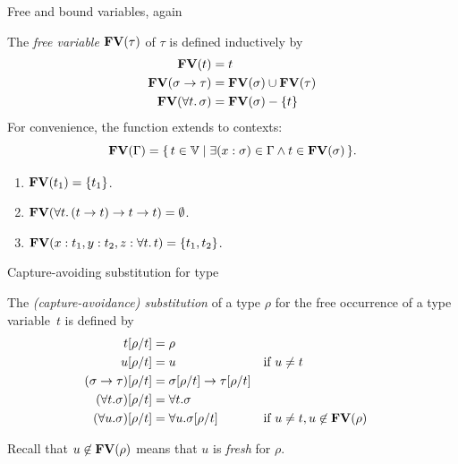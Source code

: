 \begin{frame}{Free and bound variables, again}
\begin{definition}
  The \emph{free variable} $\mathbf{FV}(\tau)$ of $\tau$ is defined inductively by
  \begin{align*}
    \mathbf{FV}(t) & {} = t \\
    \mathbf{FV}(\sigma \to \tau) & {} = \mathbf{FV}(\sigma) \cup \mathbf{FV}(\tau) \\
    \mathbf{FV}(\forall t.\, \sigma) & {} = \mathbf{FV}(\sigma) - \{t\}
  \end{align*}
  For convenience, the function extends to contexts:
  \[
    \mathbf{FV}(\Gamma) = \{\, t \in \mathbb{V}\mid \exists (x : \sigma) \in \Gamma
      \wedge t \in \mathbf{FV}(\sigma) \,\}.
  \]
\end{definition}
  \begin{enumerate}
    \item $\mathbf{FV}(t_1) = \{t_1\}$.
    \item $\mathbf{FV}(\forall t.\, (t \to t) \to t \to t) = \emptyset$.
    \item $\mathbf{FV}(x : t_1, y : t_2, z : \forall t.\,t)
      = \{t_1, t_2\}$.
  \end{enumerate}
\end{frame}
\begin{frame}{Capture-avoiding substitution for type}
  \begin{definition}
  The \emph{(capture-avoidance) substitution} of a type $\rho$ for the free
  occurrence of a type variable~$t$ is defined by 
  \begin{align*}
    t[{\rho}/{t}] & = \rho \\
    u[{\rho}/{t}] & = u && \text{if $u \neq t$}\\
    (\sigma\to\tau)[{\rho}/{t}] & =
    \sigma[{\rho}/{t}] \to
    \tau[{\rho}/{t}] \\
    (\forall t.\sigma)[{\rho}/{t}] & = \forall t.\sigma \\
    (\forall u.\sigma)[{\rho}/{t}] & = \forall u.\sigma[{\rho}/{t}]
                                      &&
    \text{if $u \neq t, u \not\in \mathbf{FV}(\rho)$} 
  \end{align*}
  \end{definition}
  Recall that $u \not\in \mathbf{FV}(\rho)$ means that $u$ is \emph{fresh} for $\rho$. 
\end{frame}

